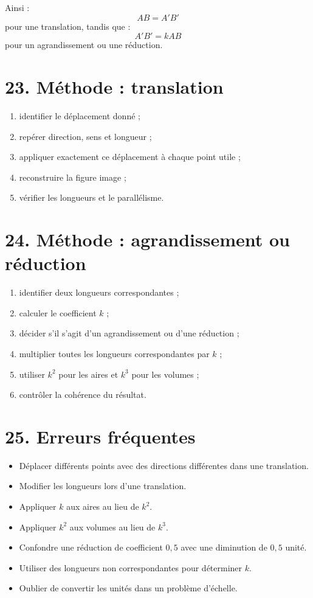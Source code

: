 Ainsi :
\[
AB=A'B'
\]
pour une translation, tandis que :
\[
A'B'=kAB
\]
pour un agrandissement ou une réduction.

\section{23. Méthode : translation}

\begin{methode}
\begin{enumerate}
\item identifier le déplacement donné ;
\item repérer direction, sens et longueur ;
\item appliquer exactement ce déplacement à chaque point utile ;
\item reconstruire la figure image ;
\item vérifier les longueurs et le parallélisme.
\end{enumerate}
\end{methode}

\section{24. Méthode : agrandissement ou réduction}

\begin{methode}
\begin{enumerate}
\item identifier deux longueurs correspondantes ;
\item calculer le coefficient $k$ ;
\item décider s'il s'agit d'un agrandissement ou d'une réduction ;
\item multiplier toutes les longueurs correspondantes par $k$ ;
\item utiliser $k^2$ pour les aires et $k^3$ pour les volumes ;
\item contrôler la cohérence du résultat.
\end{enumerate}
\end{methode}

\section{25. Erreurs fréquentes}

\begin{itemize}
\item Déplacer différents points avec des directions différentes dans une translation.
\item Modifier les longueurs lors d'une translation.
\item Appliquer $k$ aux aires au lieu de $k^2$.
\item Appliquer $k^2$ aux volumes au lieu de $k^3$.
\item Confondre une réduction de coefficient $0{,}5$ avec une diminution de $0{,}5$ unité.
\item Utiliser des longueurs non correspondantes pour déterminer $k$.
\item Oublier de convertir les unités dans un problème d'échelle.
\end{itemize}

